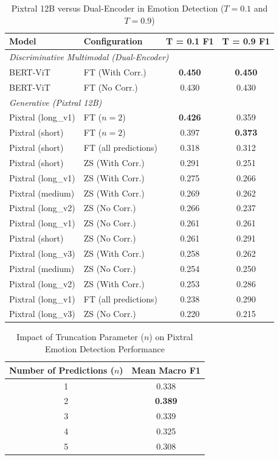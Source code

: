 \begin{table}[!t]
\centering
\caption{Pixtral 12B versus Dual-Encoder in Emotion Detection ($T=0.1$ and $T=0.9$)}
\label{tab:emotion_pixtral}
\footnotesize
\renewcommand{\arraystretch}{0.92}
\begin{tabular}{l l c c}
\hline
\textbf{Model} & \textbf{Configuration} & \textbf{T = 0.1 F1} & \textbf{T = 0.9 F1} \\
\hline
\multicolumn{4}{l}{\textit{Discriminative Multimodal (Dual-Encoder)}} \\
BERT-ViT & FT (With Corr.) & \textbf{0.450} & \textbf{0.450} \\
BERT-ViT & FT (No Corr.) & 0.430 & 0.430 \\
\hline
\multicolumn{4}{l}{\textit{Generative (Pixtral 12B)}} \\
Pixtral (long\_v1) & FT ($n=2$) & \textbf{0.426} & 0.359 \\
Pixtral (short) & FT ($n=2$) & 0.397 & \textbf{0.373} \\
Pixtral (short) & FT (all predictions) & 0.318 & 0.312 \\
Pixtral (short) & ZS (With Corr.) & 0.291 & 0.251 \\
Pixtral (long\_v1) & ZS (With Corr.) & 0.275 & 0.266 \\
Pixtral (medium) & ZS (With Corr.) & 0.269 & 0.262 \\
Pixtral (long\_v2) & ZS (No Corr.) & 0.266 & 0.237 \\
Pixtral (long\_v1) & ZS (No Corr.) & 0.261 & 0.261 \\
Pixtral (short) & ZS (No Corr.) & 0.261 & 0.291 \\
Pixtral (long\_v3) & ZS (With Corr.) & 0.258 & 0.262 \\
Pixtral (medium) & ZS (No Corr.) & 0.254 & 0.250 \\
Pixtral (long\_v2) & ZS (With Corr.) & 0.253 & 0.286 \\
Pixtral (long\_v1) & FT (all predictions) & 0.238 & 0.290 \\
Pixtral (long\_v3) & ZS (No Corr.) & 0.220 & 0.215 \\
\hline
\end{tabular}
\end{table}

\begin{table}[!t]
\centering
\caption{Impact of Truncation Parameter ($n$) on Pixtral Emotion Detection Performance}
\label{table:truncation_parameter}
\small
\begin{tabular}{c c}
\hline
\textbf{Number of Predictions ($n$)} & \textbf{Mean Macro F1} \\
\hline
1 & 0.338 \\
2 & \textbf{0.389} \\
3 & 0.339 \\
4 & 0.325 \\
5 & 0.308 \\
\hline
\end{tabular}
\end{table}

